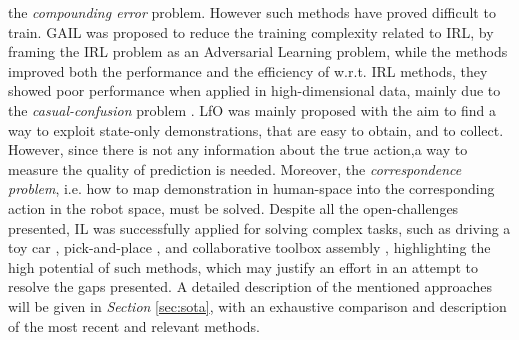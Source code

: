the \textit{compounding error} problem. However such methods have proved difficult to train. GAIL was proposed to reduce
the training complexity related to IRL, by framing the IRL problem as an Adversarial Learning problem, while the methods
improved both the performance and the efficiency of w.r.t. IRL methods, they showed poor performance when applied in
high-dimensional data, mainly due to the \textit{casual-confusion} problem \cite{}. LfO \cite{} was mainly proposed with
the aim to find a way to exploit state-only demonstrations, that are easy to obtain, and to collect. However, since
there is not any information about the true action,a way to measure the quality of prediction is needed. Moreover, the
\textit{correspondence problem}, i.e. how to map demonstration in human-space into the corresponding action in the robot
space, must be solved.     
\newline Despite all the open-challenges presented, IL was successfully applied for solving complex tasks, such as
driving a toy car \cite{codevilla2018end_to_end}, pick-and-place \cite{zhang2018deep}, and collaborative toolbox
assembly \cite{maeda2017probabilistic}, highlighting the high potential of such methods, which may justify an effort in
an attempt to resolve the gaps presented. A detailed description of the mentioned approaches will be given in
\textit{Section} \ref{sec:sota}, with an exhaustive comparison and description of the most recent and relevant methods.


